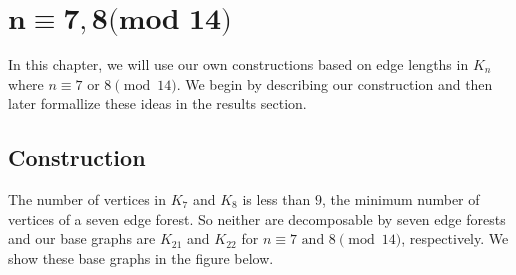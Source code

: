 \chapter{$\mathbf{n\equiv 7,8\textbf{(mod 14)}}$} \label{chap:7,8 (mod 14)}
In this chapter, we will use our own constructions based on edge lengths in $K_{n}$ where $n \equiv 7\text{ or }8 \pmod{14}$. We begin by describing our construction and then later formallize these ideas in the results section.
\section{Construction}\label{sec:7,8constr}
 The number of vertices in $K_{7}$ and $K_{8}$ is less than $9$, the minimum number of vertices of a seven edge forest. So neither are decomposable by seven edge forests and our base graphs are $K_{21}$ and $K_{22}$ for $n\equiv 7\text{ and }8\pmod{14}$, respectively. We show these base graphs in the figure below.
